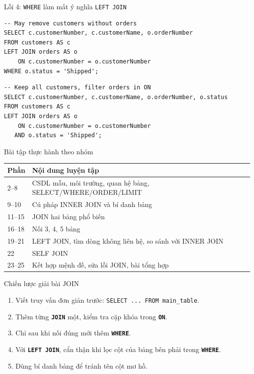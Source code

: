 \documentclass[aspectratio=169,11pt]{beamer}
\newcommand{\kw}[1]{\textbf{\texttt{#1}}}
\begin{document}
\begin{frame}[fragile]{Lỗi 4: \texttt{WHERE} làm mất ý nghĩa \texttt{LEFT JOIN}}
\begin{lstlisting}
-- May remove customers without orders
SELECT c.customerNumber, c.customerName, o.orderNumber
FROM customers AS c
LEFT JOIN orders AS o
    ON c.customerNumber = o.customerNumber
WHERE o.status = 'Shipped';
\end{lstlisting}
\begin{lstlisting}
-- Keep all customers, filter orders in ON
SELECT c.customerNumber, c.customerName, o.orderNumber, o.status
FROM customers AS c
LEFT JOIN orders AS o
    ON c.customerNumber = o.customerNumber
   AND o.status = 'Shipped';
\end{lstlisting}
\end{frame}

\begin{frame}{Bài tập thực hành theo nhóm}
\scriptsize
\begin{tabularx}{\textwidth}{l X}
\toprule
Phần & Nội dung luyện tập \\
\midrule
2--8 & CSDL mẫu, môi trường, quan hệ bảng, SELECT/WHERE/ORDER/LIMIT \\
9--10 & Cú pháp INNER JOIN và bí danh bảng \\
11--15 & JOIN hai bảng phổ biến \\
16--18 & Nối 3, 4, 5 bảng \\
19--21 & LEFT JOIN, tìm dòng không liên hệ, so sánh với INNER JOIN \\
22 & SELF JOIN \\
23--25 & Kết hợp mệnh đề, sửa lỗi JOIN, bài tổng hợp \\
\bottomrule
\end{tabularx}
\end{frame}

\begin{frame}{Chiến lược giải bài JOIN}
\begin{enumerate}
  \item Viết truy vấn đơn giản trước: \texttt{SELECT ... FROM main\_table}.
  \item Thêm từng \kw{JOIN} một, kiểm tra cặp khóa trong \kw{ON}.
  \item Chỉ sau khi nối đúng mới thêm \kw{WHERE}.
  \item Với \kw{LEFT JOIN}, cẩn thận khi lọc cột của bảng bên phải trong \kw{WHERE}.
  \item Dùng bí danh bảng để tránh tên cột mơ hồ.
\end{enumerate}
\end{frame}
\end{document}
